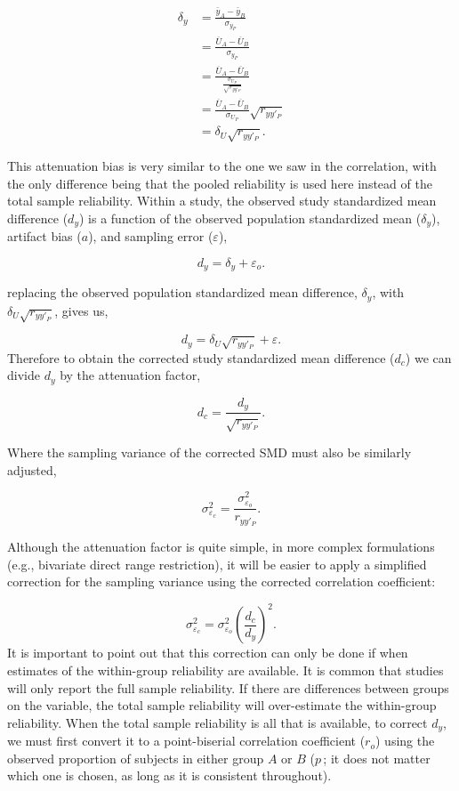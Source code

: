 \documentclass[
  letterpaper,
  DIV=11,
  numbers=noendperiod]{scrreprt}
\begin{document}
\begin{align}
\delta_y &= \frac{\bar{y}_A-\bar{y}_B}{\sigma_{y_P}}
\\[1em] &= \frac{\overline{U}_A-\overline{U}_B}{\sigma_{y_P}}
\\[1em] &= \frac{\overline{U}_A-\overline{U}_B}{\frac{\sigma_{U_P}}{\sqrt{r_{yy'_P}}}} 
\\[1em] &= \frac{\overline{U}_A-\overline{U}_B}{\sigma_{U_P}}\sqrt{r_{yy'_P}}
\\[1em] &= \delta_U\sqrt{r_{yy'_P}}.
\end{align}

This attenuation bias is very similar to the one we saw in the
correlation, with the only difference being that the pooled reliability
is used here instead of the total sample reliability. Within a study,
the observed study standardized mean difference (\(d_y\)) is a function
of the observed population standardized mean (\(\delta_y\)), artifact
bias (\(a\)), and sampling error (\(\varepsilon\)),

\[
d_y = \delta_y + \varepsilon_o.
\]

replacing the observed population standardized mean difference,
\(\delta_y\), with \(\delta_U\sqrt{r_{yy'_P}}\), gives us,

\[
d_y = \delta_U\sqrt{r_{yy'_P}} + \varepsilon.
\] Therefore to obtain the corrected study standardized mean difference
(\(d_c\)) we can divide \(d_y\) by the attenuation factor,

\[
d_c = \frac{d_y}{\sqrt{r_{yy'_P}}}.
\]

Where the sampling variance of the corrected SMD must also be similarly
adjusted,

\[
\sigma^2_{\varepsilon_c} = \frac{\sigma^2_{\varepsilon_o}}{r_{yy'_P}}.
\]

Although the attenuation factor is quite simple, in more complex
formulations (e.g., bivariate direct range restriction), it will be
easier to apply a simplified correction for the sampling variance using
the corrected correlation coefficient:

\[
\sigma^2_{\varepsilon_c} = \sigma^2_{\varepsilon_o}\left(\frac{d_c}{d_y}\right)^2.
\] It is important to point out that this correction can only be done if
when estimates of the within-group reliability are available. It is
common that studies will only report the full sample reliability. If
there are differences between groups on the variable, the total sample
reliability will over-estimate the within-group reliability. When the
total sample reliability is all that is available, to correct \(d_y\),
we must first convert it to a point-biserial correlation coefficient
(\(r_o\)) using the observed proportion of subjects in either group
\(A\) or \(B\) (\(p\,\); it does not matter which one is chosen, as long
as it is consistent throughout).
\end{document}
